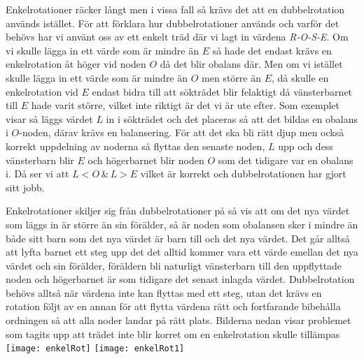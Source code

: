 \documentclass[a5paper,10pt,oneside]{article}
\begin{document}
Enkelrotationer räcker långt men i vissa fall så krävs det att en dubbelrotation används istället. För att förklara hur dubbelrotationer används och varför det behövs har vi använt oss av ett enkelt träd där vi lagt in värdena \textit{R-O-S-E}. Om vi skulle lägga in ett värde som är mindre än $E$ så hade det endast krävs en enkelrotation åt höger vid noden $O$ då det blir obalans där. Men om vi istället skulle lägga in ett värde som är mindre än $O$ men större än $E$, då skulle en enkelrotation vid $E$ endast bidra till att sökträdet blir felaktigt då vänsterbarnet till $E$ hade varit  större, vilket inte riktigt är det vi är ute efter. Som exemplet visar så läggs värdet $L$ in i sökträdet och det placeras så att det bildas en obalans i $O$-noden, därav krävs en balansering. För att det ska bli rätt djup men också korrekt uppdelning av noderna så flyttas den senaste noden, $L$ upp och dess vänsterbarn blir $E$ och högerbarnet blir noden $O$ som det tidigare var en obalans i. Då ser vi att $L < O\, \&\, L > E$ vilket är korrekt och dubbelrotationen har gjort sitt jobb.

Enkelrotationer skiljer sig från dubbelrotationer på så vis att om det nya värdet som läggs in är större än sin förälder, så är noden som obalansen sker i mindre än både sitt barn som det nya värdet är barn till och det nya värdet. Det går alltså att lyfta barnet ett steg upp det det alltid kommer vara ett värde emellan det nya värdet och sin förälder, föräldern bli naturligt vänsterbarn till den uppflyttade noden och högerbarnet är som tidigare det senast inlagda värdet. 
Dubbelrotation behövs alltså när värdena inte kan flyttas med ett steg, utan det krävs en rotation följt av en annan för att flytta värdena rätt och fortfarande bibehålla ordningen så att alla noder landar på rätt plats. Bilderna nedan visar problemet som tagits upp att trädet inte blir korret om en enkelrotation skulle tillämpas \texttt{[image: enkelRot]} \texttt{[image: enkelRot1]}
\end{document}
